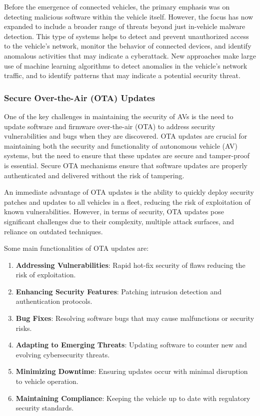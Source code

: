 Before the emergence of connected vehicles, the primary emphasis was on detecting malicious software within the vehicle itself.
However, the focus has now expanded to include a broader range of threats beyond just in-vehicle malware detection.
This type of systems helps to detect and prevent unauthorized access to the vehicle's network, monitor the behavior of connected devices, and identify anomalous activities that may indicate a cyberattack.
New approaches make large use of machine learning algorithms to detect anomalies in the vehicle's network traffic, and to identify patterns that may indicate a potential security threat\cite{nagarajan2023machine}.

\subsubsection{Secure Over-the-Air (OTA) Updates}\label{subsubsec:secure-over-the-air-ota-updates}

One of the key challenges in maintaining the security of AVs is the need to update software and firmware over-the-air (OTA) to address security vulnerabilities and bugs when they are discovered.
OTA updates are crucial for maintaining both the security and functionality of autonomous vehicle (AV) systems,\cite{durlik2022cybersecurity, ahangar2021survey} but the need to ensure that these updates are secure and tamper-proof is essential.
Secure OTA mechanisms ensure that software updates are properly authenticated and delivered without the risk of tampering.

An immediate advantage of OTA updates is the ability to quickly deploy security patches and updates to all vehicles in a fleet, reducing the risk of exploitation of known vulnerabilities.
However, in terms of security, OTA updates pose significant challenges due to their complexity, multiple attack surfaces, and reliance on outdated techniques.

Some main functionalities of OTA updates are:
\begin{enumerate}
    \item \textbf{Addressing Vulnerabilities}: Rapid hot-fix security of flaws reducing the risk of exploitation.
    \item \textbf{Enhancing Security Features}: Patching intrusion detection and authentication protocols.
    \item \textbf{Bug Fixes}: Resolving software bugs that may cause malfunctions or security risks.
    \item \textbf{Adapting to Emerging Threats}: Updating software to counter new and evolving cybersecurity threats.
    \item \textbf{Minimizing Downtime}: Ensuring updates occur with minimal disruption to vehicle operation.
    \item \textbf{Maintaining Compliance}: Keeping the vehicle up to date with regulatory security standards.
\end{enumerate}

